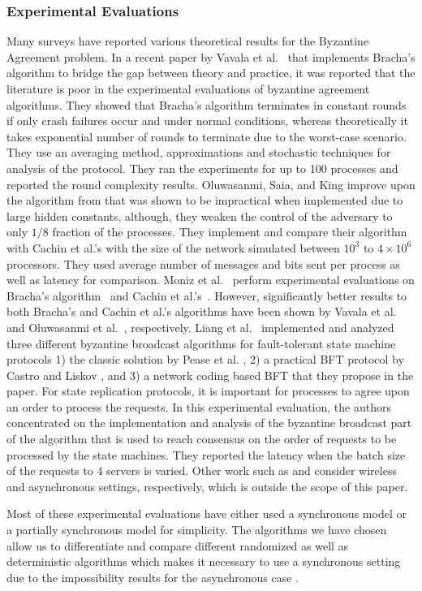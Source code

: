 \subsubsection{Experimental Evaluations}
Many surveys have reported various theoretical results for the Byzantine Agreement problem. In a recent paper by Vavala et al.~\cite{VN12} that implements Bracha's algorithm \cite{Bracha84} to bridge the gap between theory and practice, it was reported that the literature is poor in the experimental evaluations of byzantine agreement algorithms. They showed that Bracha's algorithm terminates in constant rounds if only crash failures occur and under normal conditions, whereas theoretically it takes exponential number of rounds to terminate due to the worst-case scenario. They use an averaging method, approximations and stochastic techniques for analysis of the protocol. They ran the experiments for up to 100 processes and reported the round complexity results. Oluwasanmi, Saia, and King \cite{OSK10} improve upon the algorithm from \cite{KS09} that was shown to be impractical when implemented due to large hidden constants, although, they weaken the control of the adversary to only $1/8$ fraction of the processes. They implement and compare their algorithm with Cachin et al.'s \cite{CKS05} with the size of the network simulated between $10^3$ to $4\times10^6$ processors. They used average number of messages and bits sent per process as well as latency for comparison. Moniz et al.~\cite{MNCV06} perform experimental evaluations on Bracha's algorithm~\cite{Bracha84} and Cachin et al.'s~\cite{CKS05}. However, significantly better results to both Bracha's and Cachin et al.'s algorithms have been shown by Vavala et al.~\cite{VN12} and Oluwasanmi et al.~\cite{OSK10}, respectively. Liang et al.~\cite{LSV12} implemented and analyzed three different byzantine broadcast algorithms for fault-tolerant state machine protocols 1) the classic solution by Pease et al. \cite{PeaseSL80}, 2) a practical BFT protocol by Castro and Liskov \cite{CL02}, and 3) a network coding based BFT that they propose in the paper. For state replication protocols, it is important for processes to agree upon an order to process the requests. In this experimental evaluation, the authors concentrated on the implementation and analysis of the byzantine broadcast part of the algorithm that is used to reach consensus on the order of requests to be processed by the state machines. They reported the latency when the batch size of the requests to $4$ servers is varied. Other work such as \cite{MNC10} and \cite{MNCV11} consider wireless and asynchronous settings, respectively, which is outside the scope of this paper.

Most of these experimental evaluations have either used a synchronous model or a partially synchronous model for simplicity. The algorithms we have chosen allow us to differentiate and compare different randomized as well as deterministic algorithms which makes it necessary to use a synchronous setting due to the impossibility results for the asynchronous case \cite{FischerLP83}. 

